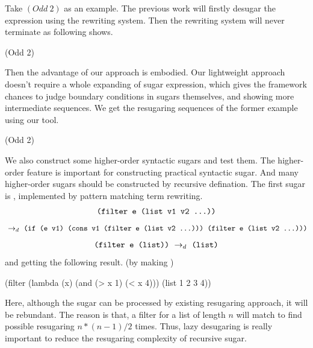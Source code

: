 Take $(Odd~2)$ as an example. The previous work will firstly desugar the expression using the rewriting system. Then the rewriting system will never terminate as following shows.
\begin{Codes}
   (Odd 2)
\end{Codes}


Then the advantage of our approach is embodied. Our lightweight approach doesn't require a whole expanding of sugar expression, which gives the framework chances to judge boundary conditions in sugars themselves, and showing more intermediate sequences. We get the resugaring sequences of the former example using our tool.
\begin{Codes}
    (Odd 2)
\end{Codes}


We also construct some higher-order syntactic sugars and test them. The higher-order feature is important for constructing practical syntactic sugar. And many higher-order sugars should be constructed by recursive defination. The first sugar is , implemented by pattern matching term rewriting.
\[\texttt{(filter e (list v1 v2 ...))}\]
\[
~\rightarrow_d~ \texttt{(if (e v1) (cons v1 (filter e (list v2 ...)))\ (filter e (list v2 ...)))}
\]
\[
\texttt{(filter e (list))} ~\rightarrow_d~ \texttt{(list)}
\]
and getting the following result. (by making   )

\begin{Codes}
    (filter (lambda (x) (and (> x 1) (< x 4))) (list 1 2 3 4))
\end{Codes}

Here, although the sugar can be processed by existing resugaring approach, it will be rebundant. The reason is that, a filter for a list of length $n$ will match to find possible resugaring $n*(n-1)/2$ times. Thus, lazy desugaring is really important to reduce the resugaring complexity of recursive sugar.

